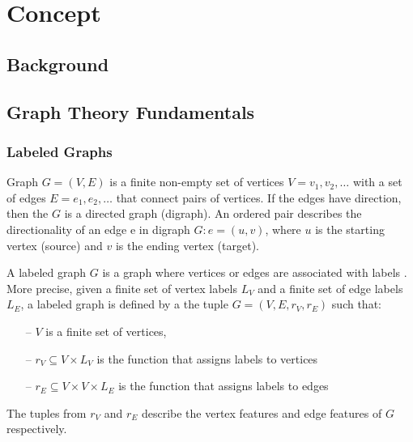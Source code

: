 
\chapter{Concept} \label{chap:Concept}
\minitoc\vspace{1em}

\section{Background}

\section{Graph Theory Fundamentals}
\subsection{Labeled Graphs}
Graph $G = (V,E)$ is a finite non-empty set of vertices $V = {v_{1}, v_{2}, …}$ with a set of edges $E = {e_{1}, e_{2}, …}$ that connect pairs of vertices.
If the edges have direction, then the $G$ is a directed graph (digraph). 
An ordered pair describes the directionality of an edge e in digraph $G: e = (u,v)$,
where $u$ is the starting vertex (source) and $v$ is the ending vertex (target). 

A labeled graph $G$ is a graph where vertices or edges are associated with labels \cite{Champin2003}. 
More precise, given a finite set of vertex labels $L_{V}$ and a finite set of edge labels $L_{E}$, a labeled graph is defined by a the tuple $G = (V, E, r_{V} , r_{E})$ such that:

\begin{itemize}
	\item[--]  $V$ is a finite set of vertices,
	\item[--] $r_{V} \subseteq V \times L_{V}$ is the function that assigns labels to vertices
	\item[--]  $r_{E} \subseteq V \times V \times L_{E}$ is the function that assigns labels to edges
\end{itemize}

The tuples from $r_{V}$ and $ r_{E} $ describe the vertex features and edge features of $G$ respectively. 


